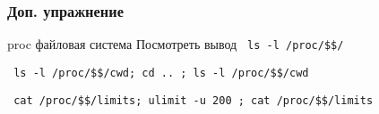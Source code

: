 \begin{frame}[fragile]
  \frametitle{Доп. упражнение}
  \begin{block}{proc файловая система}
    Посмотреть вывод \verb+ ls -l /proc/$$/ +

    \verb+ ls -l /proc/$$/cwd; cd .. ; ls -l /proc/$$/cwd +
    
    \verb+ cat /proc/$$/limits; ulimit -u 200 ; cat /proc/$$/limits +

  \end{block}
\end{frame}


%
